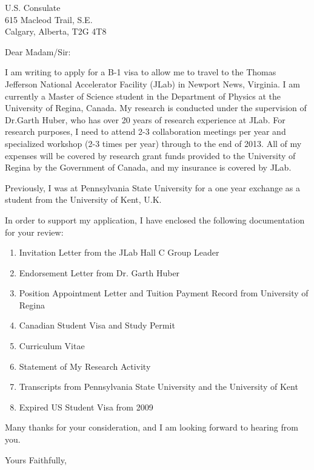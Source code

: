 \documentclass[12pt, letterpaper]{letter}
\begin{document}
 
\begin{letter}{U.S. Consulate\\ 615 Macleod Trail, S.E. \\ Calgary, Alberta, T2G 4T8}

\opening{Dear Madam/Sir:}

I am writing to apply for a B-1 visa to allow me to travel to the Thomas
Jefferson National Accelerator Facility (JLab) in Newport News, Virginia. I am
currently a Master of Science student in the Department of Physics at the
University of Regina, Canada.  My research is conducted under the supervision
of Dr.Garth Huber, who has over 20 years of research experience at JLab. For
research purposes, I need to attend 2-3 collaboration meetings per year and
specialized workshop (2-3 times per year) through to the end of 2013.  All of
my expenses will be covered by research grant funds provided to the University
of Regina by the Government of Canada, and my insurance is covered by JLab.

Previously, I was at Pennsylvania State University for a one year exchange as
a student from the University of Kent, U.K.

In order to support my application, I have enclosed the following documentation
for your review:
\vspace{-5mm}
\begin{enumerate}
	\item Invitation Letter from the JLab Hall C Group Leader
	\item Endorsement Letter from Dr. Garth Huber 
	\item Position Appointment Letter and Tuition Payment Record from University of Regina
	\item Canadian Student Visa and Study Permit
	\item Curriculum Vitae
	\item Statement of My Research Activity
	\item Transcripts from Pennsylvania State University and the University
	of Kent
	\item Expired US Student Visa from 2009
\end{enumerate}
\vspace{-2mm}

Many thanks for your consideration, and I am looking forward to hearing from you.

\closing{Yours Faithfully,}
 



\end{letter}
\end{document}
